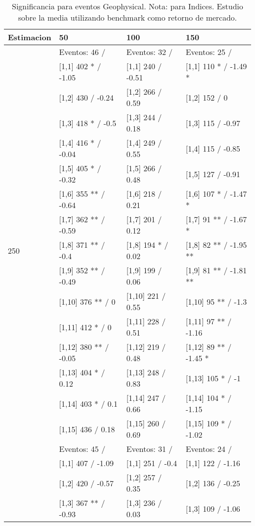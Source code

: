 \begin{table}

\caption{Significancia para eventos Geophysical. Nota: para Indices. Estudio sobre la media utilizando benchmark como retorno de mercado.}
\centering
\begin{tabular}[t]{llll}
\toprule
Estimacion & 50 & 100 & 150\\
\midrule
 & Eventos:  46 / & Eventos:  32 / & Eventos:  25 /\\
 & {}[1,1] 402 * / -1.05 & {}[1,1] 240  / -0.51 & {}[1,1] 110 * / -1.49 *\\
 & {}[1,2] 430  / -0.24 & {}[1,2] 266  / 0.59 & {}[1,2] 152  / 0\\
 & {}[1,3] 418 * / -0.5 & {}[1,3] 244  / 0.18 & {}[1,3] 115  / -0.97\\
 & {}[1,4] 416 * / -0.04 & {}[1,4] 249  / 0.55 & {}[1,4] 115  / -0.85\\
\addlinespace
 & {}[1,5] 405 * / -0.32 & {}[1,5] 266  / 0.48 & {}[1,5] 127  / -0.91\\
 & {}[1,6] 355 ** / -0.64 & {}[1,6] 218  / 0.21 & {}[1,6] 107 * / -1.47 *\\
 & {}[1,7] 362 ** / -0.59 & {}[1,7] 201  / 0.12 & {}[1,7] 91 ** / -1.67 *\\
250 & {}[1,8] 371 ** / -0.4 & {}[1,8] 194 * / 0.02 & {}[1,8] 82 ** / -1.95 **\\
 & {}[1,9] 352 ** / -0.49 & {}[1,9] 199  / 0.06 & {}[1,9] 81 ** / -1.81 **\\
\addlinespace
 & {}[1,10] 376 ** / 0 & {}[1,10] 221  / 0.55 & {}[1,10] 95 ** / -1.3\\
 & {}[1,11] 412 * / 0 & {}[1,11] 228  / 0.51 & {}[1,11] 97 ** / -1.16\\
 & {}[1,12] 380 ** / -0.05 & {}[1,12] 219  / 0.48 & {}[1,12] 89 ** / -1.45 *\\
 & {}[1,13] 404 * / 0.12 & {}[1,13] 248  / 0.83 & {}[1,13] 105 * / -1\\
 & {}[1,14] 403 * / 0.1 & {}[1,14] 247  / 0.66 & {}[1,14] 104 * / -1.15\\
\addlinespace
 & {}[1,15] 436  / 0.18 & {}[1,15] 260  / 0.69 & {}[1,15] 109 * / -1.02\\
 & Eventos:  45 / & Eventos:  31 / & Eventos:  24 /\\
 & {}[1,1] 407  / -1.09 & {}[1,1] 251  / -0.4 & {}[1,1] 122  / -1.16\\
 & {}[1,2] 420  / -0.57 & {}[1,2] 257  / 0.35 & {}[1,2] 136  / -0.25\\
 & {}[1,3] 367 ** / -0.93 & {}[1,3] 236  / 0.03 & {}[1,3] 109  / -1.06\\

\end{tabular}
\end{table}

